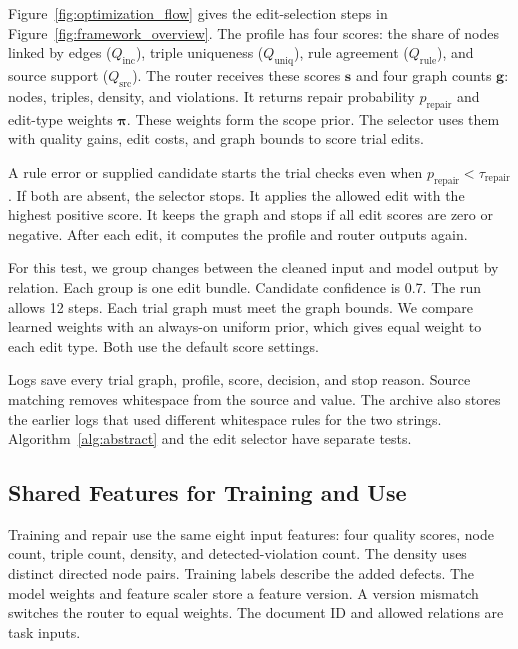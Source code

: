 Figure~\ref{fig:optimization_flow} gives the edit-selection steps in
Figure~\ref{fig:framework_overview}. The profile has four scores:
the share of nodes linked by edges ($Q_{\mathrm{inc}}$), triple uniqueness
($Q_{\mathrm{uniq}}$), rule agreement ($Q_{\mathrm{rule}}$), and source
support ($Q_{\mathrm{src}}$). The router receives these scores $\mathbf{s}$
and four graph counts $\mathbf{g}$: nodes, triples, density, and violations.
It returns repair probability $p_{\mathrm{repair}}$ and edit-type weights
$\boldsymbol{\pi}$. These weights form the scope prior. The selector uses
them with quality gains, edit costs, and graph bounds to score trial edits.

A rule error or supplied candidate starts the trial checks even when
$p_{\mathrm{repair}}<\tau_{\mathrm{repair}}$. If both are absent, the selector
stops. It applies the allowed edit with the highest positive score.
It keeps the graph and stops if all edit scores are zero or negative.
After each edit, it computes the profile and router outputs again.

For this test, we group changes between the cleaned input and model output
by relation. Each group is one edit bundle. Candidate confidence is 0.7.
The run allows 12 steps. Each trial graph must meet the graph bounds.
We compare learned weights with an always-on uniform prior, which gives
equal weight to each edit type. Both use the default score settings.

Logs save every trial graph, profile, score, decision, and stop reason.
Source matching removes whitespace from the source and value.
The archive also stores the earlier logs that used different whitespace
rules for the two strings. Algorithm~\ref{alg:abstract} and the edit selector
have separate tests.

\subsection{Shared Features for Training and Use}
\label{sec:impl:profile_revision}

Training and repair use the same eight input features: four quality scores,
node count, triple count, density, and detected-violation count.
The density uses distinct directed node pairs. Training labels describe
the added defects. The model weights and feature scaler store a feature
version. A version mismatch switches the router to equal weights.
The document ID and allowed relations are task inputs.

